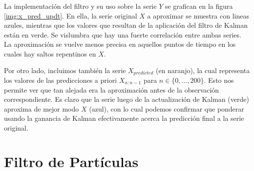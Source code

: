 \documentclass[letterpaper,11pt,oneside]{article}
\begin{document}

La implementación del filtro y su uso sobre la serie $Y$ se grafican en la figura \ref{img:x_pred_updt}. En ella, la serie original $X$ a aproximar se muestra con lineas azules, mientras que los valores que resultan de la aplicación del filtro de Kalman están en verde. Se vislumbra que hay una fuerte correlación entre ambas series. La aproximación se vuelve menos precisa en aquellos puntos de tiempo en los cuales hay saltos repentinos en $X$.

Por otro lado, incluimos también la serie $X_{predicted}$ (en \color{orange}naranjo\color{black}), la cual representa los valores de las predicciones a priori $X_{n:n-1}$ para $n\in\{0,\dots,200\}$. Esto nos permite ver que tan alejada era la aproximación antes de la observación correspondiente. Es claro que la serie luego de la actualización de Kalman (\color{green}verde\color{black}) aproxima de mejor modo $X$ (\color{blue}azul\color{black}), con lo cual podemos confirmar que ponderar usando la ganancia de Kalman efectivamente acerca la predicción final a la serie original.


\section{Filtro de Partículas}

\lipsum[1]


\lipsum[2]


\lipsum[3]


\end{document}
